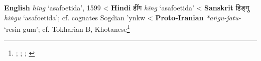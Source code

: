 \begin{etymology}\label{ety:hing}
\textbf{English} \textit{hing} `asafoetida', 1599
< \textbf{Hindi} {हींग} \textit{hīng} `asafoetida'
< \textbf{Sanskrit} {हिङ्गु} \textit{hiṅgu} `asafoetida'; cf. cognates Sogdian 'ynkw
< \textbf{Proto-Iranian} \textit{*aṅgu-ǰatu-} `resin-gum'; cf. Tokharian B, Khotanese\footnote{\textcite[s.v. hing]{oed}; \textcite[s.v. hing]{oed}; \textcite[87]{gharib_sogdian_1995}; \textcite[7]{adams_dictionary_2013}}
\end{etymology}